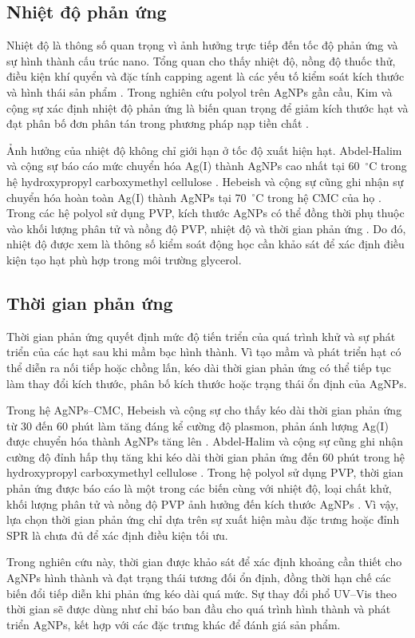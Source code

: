 \subsection{Nhiệt độ phản ứng}
Nhiệt độ là thông số quan trọng vì ảnh hưởng trực tiếp đến tốc độ phản ứng và sự hình thành cấu trúc nano.
Tổng quan cho thấy nhiệt độ, nồng độ thuốc thử, điều kiện khí quyển và đặc tính capping agent là các yếu tố kiểm soát kích thước và hình thái sản phẩm \parencite{hemmati2020}.
Trong nghiên cứu polyol trên AgNPs gần cầu, Kim và cộng sự xác định nhiệt độ phản ứng là biến quan trọng để giảm kích thước hạt và đạt phân bố đơn phân tán trong phương pháp nạp tiền chất \parencite{kim2006}.
\par
Ảnh hưởng của nhiệt độ không chỉ giới hạn ở tốc độ xuất hiện hạt.
Abdel-Halim và cộng sự báo cáo mức chuyển hóa Ag(I) thành AgNPs cao nhất tại 60~$^\circ$C trong hệ hydroxypropyl carboxymethyl cellulose \parencite{abdelhalim2015}.
Hebeish và cộng sự cũng ghi nhận sự chuyển hóa hoàn toàn Ag(I) thành AgNPs tại 70~$^\circ$C trong hệ CMC của họ \parencite{hebeish2010}.
Trong các hệ polyol sử dụng PVP, kích thước AgNPs có thể đồng thời phụ thuộc vào khối lượng phân tử và nồng độ PVP, nhiệt độ và thời gian phản ứng \parencite{rashid2026,kim2006}.
Do đó, nhiệt độ được xem là thông số kiểm soát động học cần khảo sát để xác định điều kiện tạo hạt phù hợp trong môi trường glycerol.
\subsection{Thời gian phản ứng}
Thời gian phản ứng quyết định mức độ tiến triển của quá trình khử và sự phát triển của các hạt sau khi mầm bạc hình thành.
Vì tạo mầm và phát triển hạt có thể diễn ra nối tiếp hoặc chồng lấn, kéo dài thời gian phản ứng có thể tiếp tục làm thay đổi kích thước, phân bố kích thước hoặc trạng thái ổn định của AgNPs.
\par
Trong hệ AgNPs--CMC, Hebeish và cộng sự cho thấy kéo dài thời gian phản ứng từ 30 đến 60 phút làm tăng đáng kể cường độ plasmon, phản ánh lượng Ag(I) được chuyển hóa thành AgNPs tăng lên \parencite{hebeish2010}.
Abdel-Halim và cộng sự cũng ghi nhận cường độ đỉnh hấp thụ tăng khi kéo dài thời gian phản ứng đến 60 phút trong hệ hydroxypropyl carboxymethyl cellulose \parencite{abdelhalim2015}.
Trong hệ polyol sử dụng PVP, thời gian phản ứng được báo cáo là một trong các biến cùng với nhiệt độ, loại chất khử, khối lượng phân tử và nồng độ PVP ảnh hưởng đến kích thước AgNPs \parencite{rashid2026}.
Vì vậy, lựa chọn thời gian phản ứng chỉ dựa trên sự xuất hiện màu đặc trưng hoặc đỉnh SPR là chưa đủ để xác định điều kiện tối ưu.
\par
Trong nghiên cứu này, thời gian được khảo sát để xác định khoảng cần thiết cho AgNPs hình thành và đạt trạng thái tương đối ổn định, đồng thời hạn chế các biến đổi tiếp diễn khi phản ứng kéo dài quá mức.
Sự thay đổi phổ UV--Vis theo thời gian sẽ được dùng như chỉ báo ban đầu cho quá trình hình thành và phát triển AgNPs, kết hợp với các đặc trưng khác để đánh giá sản phẩm.
